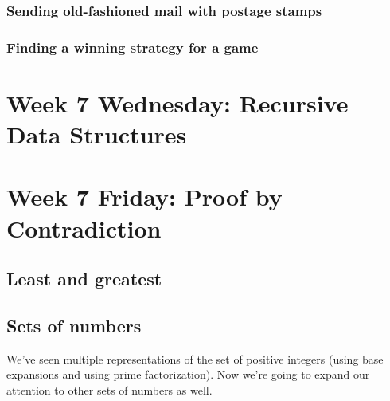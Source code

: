 \subsubsection*{Sending old-fashioned mail with postage stamps}

\newpage
\subsubsection*{Finding a winning strategy for a game}

\newpage

\section*{Week 7 Wednesday: Recursive Data Structures}



\vspace{50pt}

\vspace{50pt}

\vspace{50pt}
\newpage

\newpage

\newpage

\section*{Week 7 Friday: Proof by Contradiction}

\subsection*{Least and greatest}







\newpage
\subsection*{Sets of numbers}

We've seen multiple representations of the set of positive integers
(using base expansions and using prime factorization). Now we're 
going to expand our attention to other sets of numbers as well.





